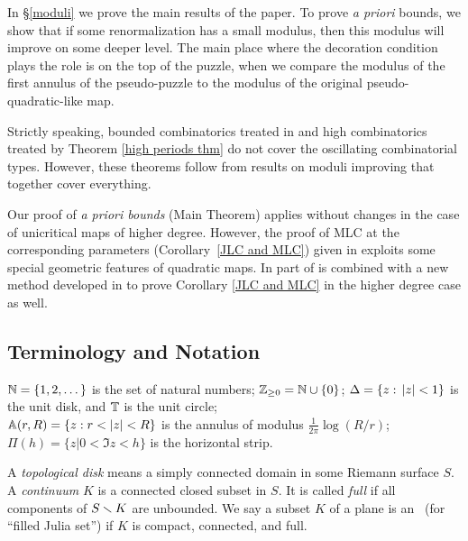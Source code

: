 In \S \ref{moduli} we prove the main results of the paper.
To prove {\it a priori} bounds,  we show  that
if some renormalization has a small modulus, then this modulus will improve on some deeper level.
The main place where the decoration condition plays the role is on the top of the puzzle,
when we compare the modulus of the first annulus of the pseudo-puzzle to the modulus of the original
pseudo-quadratic-like map.

\begin{rem}
   Strictly speaking, bounded combinatorics treated in \cite{K}
and high combinatorics treated by Theorem \ref{high periods thm} do not cover
the oscillating combinatorial types. However, these theorems follow from results
on moduli improving that together cover everything.
\end{rem}


\begin{rem}
Our proof of {\it a priori bounds} (Main Theorem) applies without changes in the case
of unicritical maps of higher degree. However, the proof of MLC at the corresponding parameters
(Corollary~\ref{JLC and MLC}) given in \cite{puzzle} exploits some special geometric features of
quadratic maps. In \cite{Ch} part of \cite{puzzle} is combined with a new method developed in
\cite{AKLS} to prove Corollary \ref{JLC and MLC} in the higher degree case as well.
\end{rem}

\subsection{Terminology and Notation}
  ${\Bbb N} =\{1,2,\dots\}$ is the set of natural numbers; ${\Bbb Z}_{\geq 0} = {\Bbb N} \cup \{0\}$;
$\Delta=\{z:\,  |z|<1\}$ is the unit disk, and ${\Bbb T}$ is the unit circle;\\
$\A(r,R)= \{z: r<|z|<R\}$ is the annulus of modulus $\frac{1}{2\pi} \log (R/r)$;\\
$\Pi(h)= \{z| 0< \Im z<h\}$ is the horizontal strip.

  A  {\it topological disk} means a simply connected  domain in some Riemann surface $S$.
A {\it continuum} $K$ is a connected closed subset in $S$. %
It is called {\it full} if all components of $S\smallsetminus K$ are unbounded.
We say a subset $K$ of a plane is an \fjset\ (for ``filled Julia set'')
if $K$ is compact, connected, and full.


